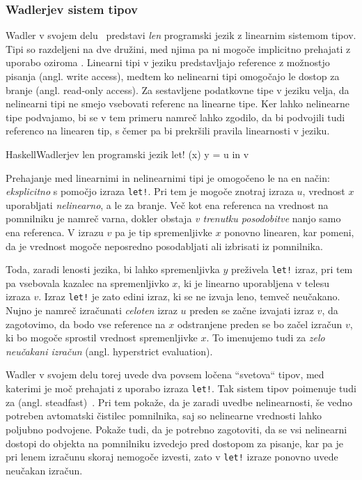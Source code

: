 \subsubsection{Wadlerjev sistem  tipov}
Wadler v svojem delu~\cite{wadler1990linear} predstavi \textit{len} programski jezik z linearnim sistemom tipov. Tipi so razdeljeni na dve družini, med njima pa ni mogoče implicitno prehajati z uporabo  oziroma . Linearni tipi v jeziku predstavljajo reference z možnostjo pisanja (angl. write access), medtem ko nelinearni tipi omogočajo le dostop za branje (angl. read-only access). Za sestavljene podatkovne tipe v jeziku velja, da nelinearni tipi ne smejo vsebovati referenc na linearne tipe. Ker lahko nelinearne tipe podvajamo, bi se v tem primeru namreč lahko zgodilo, da bi podvojili tudi referenco na linearen tip, s čemer pa bi prekršili pravila linearnosti v jeziku.

\begin{code-box}{Haskell}{Wadlerjev len programski jezik}
let! (x) y = u in v
\end{code-box}

Prehajanje med linearnimi in nelinearnimi tipi je omogočeno le na en način: \emph{eksplicitno} s pomočjo izraza \texttt{let!}. Pri tem je mogoče znotraj izraza $u$, vrednost $x$ uporabljati \emph{nelinearno}, a le za branje. Več kot ena referenca na vrednost na pomnilniku je namreč varna, dokler obstaja \emph{v trenutku posodobitve} nanjo samo ena referenca. V izrazu $v$ pa je tip spremenljivke $x$ ponovno linearen, kar pomeni, da je vrednost mogoče neposredno posodabljati ali izbrisati iz pomnilnika.

Toda, zaradi lenosti jezika, bi lahko spremenljivka $y$ preživela \texttt{let!} izraz, pri tem pa vsebovala kazalec na spremenljivko $x$, ki je linearno uporabljena v telesu izraza $v$. Izraz \texttt{let!} je zato edini izraz, ki se ne izvaja leno, temveč neučakano. Nujno je namreč izračunati \textit{celoten} izraz $u$ preden se začne izvajati izraz $v$, da zagotovimo, da bodo vse reference na $x$ odstranjene preden se bo začel izračun $v$, ki bo mogoče sprostil vrednost spremenljivke $x$. To imenujemo tudi za \textit{zelo neučakani izračun} (angl. hyperstrict evaluation).

Wadler v svojem delu torej uvede dva povsem ločena ``svetova`` tipov, med katerimi je moč prehajati z uporabo izraza \texttt{let!}. Tak sistem tipov poimenuje tudi za  (angl. steadfast)~\cite{wadler1991there}. Pri tem pokaže, da je zaradi uvedbe nelinearnosti, še vedno potreben avtomatski čistilec pomnilnika, saj so nelinearne vrednosti lahko poljubno podvojene. Pokaže tudi, da je potrebno zagotoviti, da se vsi nelinearni dostopi do objekta na pomnilniku izvedejo pred dostopom za pisanje, kar pa je pri lenem izračunu skoraj nemogoče izvesti, zato v \texttt{let!} izraze ponovno uvede neučakan izračun.


